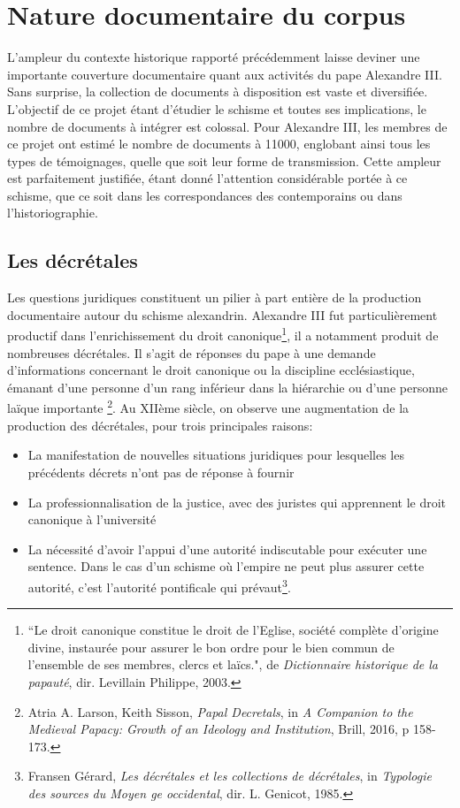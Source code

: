     \section{Nature documentaire du corpus}

L’ampleur du contexte historique rapporté précédemment laisse deviner une importante couverture documentaire quant aux activités du pape Alexandre III. Sans surprise, la collection de documents à disposition est vaste et diversifiée. L’objectif de ce projet étant d’étudier le schisme et toutes ses implications, le nombre de documents à intégrer est colossal. Pour Alexandre III, les membres de ce projet ont estimé le nombre de documents à 11000, englobant ainsi tous les types de témoignages, quelle que soit leur forme de transmission. Cette ampleur est parfaitement justifiée, étant donné l'attention considérable portée à ce schisme, que ce soit dans les correspondances des contemporains ou dans l’historiographie.

    \subsection{Les décrétales}

Les questions juridiques constituent un pilier à part entière de la production documentaire autour du schisme alexandrin. Alexandre III fut particulièrement productif dans l’enrichissement du droit canonique\footnote{“Le droit canonique constitue le droit de l'Eglise, société complète d'origine divine, instaurée pour assurer le bon ordre pour le bien commun de l'ensemble de ses membres, clercs et laïcs.", de \textit{Dictionnaire historique de la papauté}, dir. Levillain Philippe, 2003.}, il a notamment produit de nombreuses décrétales. Il s’agit de  réponses du pape à une demande d’informations concernant le droit canonique ou la discipline ecclésiastique, émanant d’une personne d’un rang inférieur dans la hiérarchie ou d’une personne laïque importante \footnote{Atria A. Larson, Keith Sisson, \textit{Papal Decretals}, in  \textit{A Companion to the Medieval Papacy: Growth of an Ideology and Institution}, Brill, 2016, p 158-173.}. Au XIIème siècle, on observe une augmentation de la production des décrétales, pour trois principales raisons: 
\begin{itemize}
    \item La manifestation de nouvelles situations juridiques pour lesquelles les précédents décrets n’ont pas de réponse à fournir 
    \item La professionnalisation de la justice, avec des juristes qui apprennent le droit canonique à l'université 
    \item La nécessité d’avoir l’appui d’une autorité indiscutable pour exécuter une sentence. Dans le cas d’un schisme où l’empire ne peut plus assurer cette autorité, c’est l’autorité pontificale qui prévaut\footnote{Fransen Gérard, \textit{Les décrétales et les collections de décrétales}, in \textit{Typologie des sources du Moyen  ge occidental}, dir. L. Genicot, 1985.}. 
\end{itemize}

